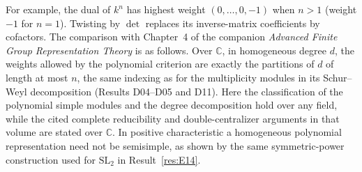 \documentclass[11pt,a4paper,openany,oneside]{book}
\theoremstyle{resultstyle}
\theoremstyle{definition}
\numberwithin{equation}{chapter}
\begin{document}
For example, the dual of \(k^n\) has highest weight \((0,\ldots,0,-1)\) when \(n>1\) (weight \(-1\) for \(n=1\)). Twisting by \(\det\) replaces its inverse-matrix coefficients by cofactors. The comparison with Chapter~4 of the companion \emph{Advanced Finite Group Representation Theory} is as follows. Over \(\mathbb C\), in homogeneous degree \(d\), the weights allowed by the polynomial criterion are exactly the partitions of \(d\) of length at most \(n\), the same indexing as for the multiplicity modules in its Schur--Weyl decomposition (Results D04--D05 and D11). Here the classification of the polynomial simple modules and the degree decomposition hold over any field, while the cited complete reducibility and double-centralizer arguments in that volume are stated over \(\mathbb C\). In positive characteristic a homogeneous polynomial representation need not be semisimple, as shown by the same symmetric-power construction used for \(\mathrm{SL}_2\) in Result~\ref{res:E14}.
\end{document}
